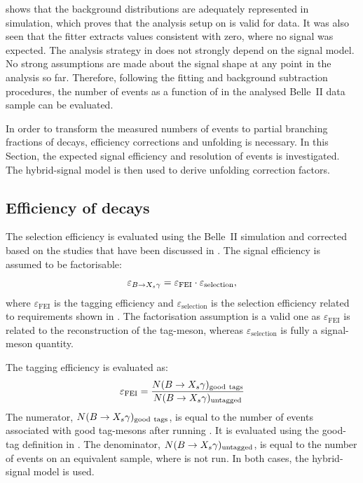  shows that the background distributions are adequately represented in simulation,
which proves that the analysis setup on \MC is valid for data.
It was also seen that the \Mbc fitter extracts values consistent with zero, where no \BtoXsgamma signal was expected.
The analysis strategy in  does not strongly depend on the signal model.
No strong assumptions are made about the signal shape at any point in the analysis so far.
Therefore, following the fitting and background subtraction procedures, the number of \BtoXsgamma events as a function of \EB in the analysed Belle~II data sample can be evaluated. 

In order to transform the measured numbers of \BtoXsgamma events to partial branching fractions of \BtoXsgamma decays, efficiency corrections and unfolding is necessary.
In this Section, the expected signal efficiency and \EB resolution of \BtoXsgamma events is investigated.
The hybrid-signal model is then used to derive unfolding correction factors.

\subsection{Efficiency of \texorpdfstring{\BtoXsgamma}{B->Xs gamma} decays}\label{sec:signal_efficiency}

The \BtoXsgamma selection efficiency is evaluated using the Belle~II simulation and corrected
based on the studies that have been discussed in .
The signal efficiency is assumed to be factorisable:
\begin{equation}\label{eq:factorisable_signal_efficiency}
    \varepsilon_{\BtoXsgamma} = \varepsilon_{\mathrm{FEI}} \cdot \varepsilon_{\mathrm{selection}},
\end{equation}
where $\varepsilon_{\mathrm{FEI}}$ is the \FEI tagging efficiency and 
$\varepsilon_{\mathrm{selection}}$ is the selection efficiency related to requirements shown in .
The factorisation assumption is a valid one as $\varepsilon_{\mathrm{FEI}}$  is related to the reconstruction of the tag-\B meson,
whereas $\varepsilon_{\mathrm{selection}}$ is fully a signal-\B meson quantity.

The \FEI tagging efficiency is evaluated as:
\begin{equation}\label{eq:fei_tagging_efficiency}
    \varepsilon_{\mathrm{FEI}} = \frac{N(\BtoXsgamma)_{\mathrm{good~tags}}}{N(\BtoXsgamma)_{\mathrm{untagged}}}
\end{equation}
The numerator, $N(\BtoXsgamma)_{\mathrm{good~tags}}$, is equal to the number of \BtoXsgamma events associated with good tag-\B mesons after running \FEI. 
It is evaluated using the good-tag definition in .
The denominator, $N(\BtoXsgamma)_{\mathrm{untagged}}$, is equal to the number of \BtoXsgamma events on an equivalent sample, where \FEI is not run.
In both cases, the hybrid-signal model is used.

